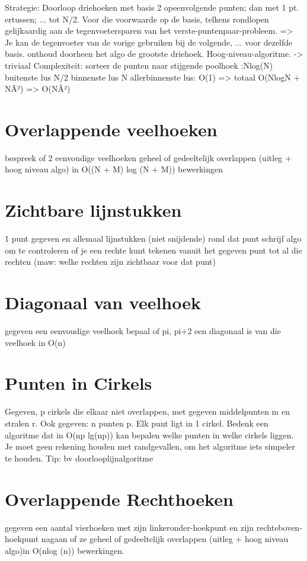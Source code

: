 \documentclass[12pt,a4paper]{article}
\begin{document}
Strategie:
        Doorloop driehoeken met basis 2 opeenvolgende punten; dan met 1 pt. ertussen; ... tot N/2.
        Voor die voorwaarde op de basis, telkens rondlopen gelijkaardig aan de tegenvoetersparen van het verste-puntenpaar-probleem. => Je kan de tegenvoeter van de vorige gebruiken bij de volgende, ... voor dezelfde basis.
        onthoud doorheen het algo de grootste driehoek. 
    Hoog-niveau-algoritme. -> triviaal
    Complexiteit:
        sorteer de punten naar stijgende poolhoek :Nlog(N)
        buitenste lus N/2
        binnenste lus N
        allerbinnenste lus: O(1)
        => totaal O(NlogN + NÂ²) => O(NÂ²) 




\section{Overlappende veelhoeken}
bespreek of 2 eenvoudige veelhoeken geheel of gedeeltelijk overlappen (uitleg + hoog niveau algo)
in O((N + M) log (N + M)) bewerkingen 

\section{Zichtbare lijnstukken}
1 punt gegeven en allemaal lijnstukken (niet snijdende) rond dat punt
schrijf algo om te controleren of je een rechte kunt tekenen vanuit het gegeven punt tot al die rechten
(maw: welke rechten zijn zichtbaar voor dat punt) 

\section{Diagonaal van veelhoek}
gegeven een eenvoudige veelhoek
bepaal of pi, pi+2 een diagonaal is van die veelhoek in O(n) 

\section{Punten in Cirkels}
Gegeven, p cirkels die elkaar niet overlappen, met gegeven middelpunten m en stralen r.
Ook gegeven: n punten p. Elk punt ligt in 1 cirkel.
Bedenk een algoritme dat in O(np lg(np)) kan bepalen welke punten in welke cirkels liggen.
Je moet geen rekening houden met randgevallen, om het algoritme iets simpeler te houden.
Tip: bv doorlooplijnalgoritme 

\section{Overlappende Rechthoeken}
gegeven een aantal vierhoeken met zijn linkeronder-hoekpunt en zijn rechteboven-hoekpunt nagaan of ze geheel of gedeeltelijk overlappen (uitleg + hoog niveau algo)in O(nlog (n)) bewerkingen. 


\fi
\end{document}
